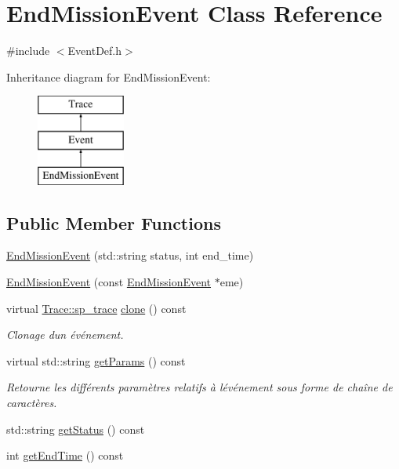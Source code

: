 \hypertarget{class_end_mission_event}{}\section{End\+Mission\+Event Class Reference}
\label{class_end_mission_event}


{\ttfamily \#include $<$Event\+Def.\+h$>$}

Inheritance diagram for End\+Mission\+Event\+:\begin{figure}[H]
\begin{center}
\leavevmode
\includegraphics[height=3.000000cm]{class_end_mission_event}
\end{center}
\end{figure}
\subsection*{Public Member Functions}
\begin{DoxyCompactItemize}
\item 
\hyperlink{class_end_mission_event_af5771a5c2a68a7a892ac41adc1ba5ac0}{End\+Mission\+Event} (std\+::string status, int end\+\_\+time)
\item 
\hyperlink{class_end_mission_event_a14c57adacbdfd9b88bad741648ed6504}{End\+Mission\+Event} (const \hyperlink{class_end_mission_event}{End\+Mission\+Event} $\ast$eme)
\item 
virtual \hyperlink{class_trace_a9c58e523529fc8a03fb6acf3eef86150}{Trace\+::sp\+\_\+trace} \hyperlink{class_end_mission_event_a2d851feeb940eb1c73ab05d8cff28d84}{clone} () const 
\begin{DoxyCompactList}\small\item\em Clonage d\textquotesingle{}un événement. \end{DoxyCompactList}\item 
virtual std\+::string \hyperlink{class_end_mission_event_a79a3dc9a0bc4e39b4f9af2d1633a5029}{get\+Params} () const 
\begin{DoxyCompactList}\small\item\em Retourne les différents paramètres relatifs à l\textquotesingle{}événement sous forme de chaîne de caractères. \end{DoxyCompactList}\item 
std\+::string \hyperlink{class_end_mission_event_a8c67c8a4e0d03a4762ea08e85e40836a}{get\+Status} () const 
\item 
int \hyperlink{class_end_mission_event_a3336c51fe092b6d9740a9c20e73c45cb}{get\+End\+Time} () const 
\end{DoxyCompactItemize}
